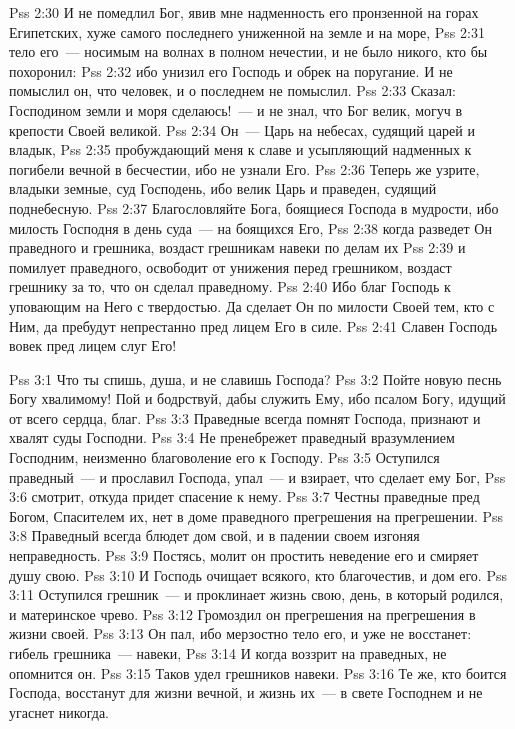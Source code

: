 \vs Pss 2:30
И не помедлил Бог, явив мне надменность его пронзенной на горах
Египетских, хуже самого последнего униженной на земле и на море,
\vs Pss 2:31
тело его~--- носимым на волнах в полном нечестии, и не было
никого, кто бы похоронил:
\vs Pss 2:32
ибо унизил его Господь и обрек на поругание. И не помыслил он, что
человек,
и о последнем не помыслил.
\vs Pss 2:33
Сказал: Господином земли и моря сделаюсь!~--- и не знал, что Бог
велик, могуч в крепости Своей великой.
\vs Pss 2:34
Он~--- Царь на небесах, судящий царей и владык,
\vs Pss 2:35
пробуждающий меня к славе и усыпляющий надменных к погибели вечной в
бесчестии, ибо не узнали Его.
\vs Pss 2:36
Теперь же узрите, владыки земные, суд Господень, ибо велик Царь и
праведен, судящий поднебесную.
\vs Pss 2:37
Благословляйте Бога, боящиеся Господа в мудрости, ибо милость
Господня в день суда~--- на боящихся Его,
\vs Pss 2:38
когда разведет Он праведного и грешника, воздаст грешникам навеки по
делам их
\vs Pss 2:39
и помилует праведного, освободит от унижения перед грешником,
воздаст грешнику за то, что он сделал праведному.
\vs Pss 2:40
Ибо благ Господь к уповающим на Него с твердостью. Да сделает Он по
милости Своей тем, кто с Ним, да пребудут непрестанно пред лицем Его в
силе.
\vs Pss 2:41
Славен Господь вовек пред лицем слуг Его!

\vs Pss 3:1
Что ты спишь, душа, и не славишь Господа?
\vs Pss 3:2
Пойте новую песнь Богу хвалимому! Пой и бодрствуй, дабы служить
Ему, ибо псалом Богу, идущий от всего сердца, благ.
\vs Pss 3:3
Праведные всегда помнят Господа, признают и хвалят суды
Господни.
\vs Pss 3:4
Не пренебрежет праведный вразумлением Господним, неизменно
благоволение его к Господу.
\vs Pss 3:5
Оступился праведный~--- и прославил Господа, упал~--- и
взирает, что сделает ему Бог,
\vs Pss 3:6
смотрит, откуда придет спасение к нему.
\vs Pss 3:7
Честны праведные пред Богом, Спасителем их, нет в доме
праведного прегрешения на прегрешении.
\vs Pss 3:8
Праведный всегда блюдет дом свой, и в падении своем изгоняя
неправедность.
\vs Pss 3:9
Постясь, молит он простить неведение его и смиряет душу
свою.
\vs Pss 3:10
И Господь очищает всякого, кто благочестив, и дом его.
\vs Pss 3:11
Оступился грешник~--- и проклинает жизнь свою, день, в который
родился, и материнское чрево.
\vs Pss 3:12
Громоздил он прегрешения на прегрешения в жизни своей.
\vs Pss 3:13
Он пал, ибо мерзостно тело его, и уже не восстанет: гибель
грешника~--- навеки,
\vs Pss 3:14
И когда воззрит на праведных, не опомнится он.
\vs Pss 3:15
Таков удел грешников навеки.
\vs Pss 3:16
Те же, кто боится Господа, восстанут для жизни вечной, и жизнь
их~--- в свете Господнем и не угаснет никогда.

